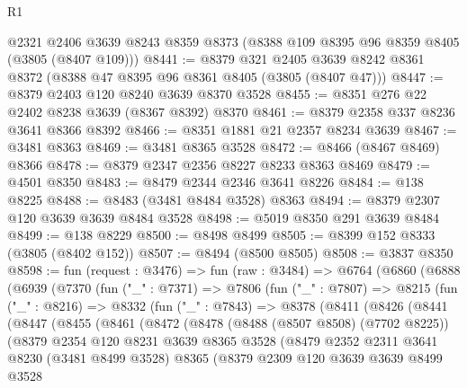 \begin{lexlean}{R1}
\begin{coremodule}
    @2321
    @2406
    @3639
    @8243
    @8359
    @8373
    (@8388 @109 @8395 @96 @8359 @8405 (@3805 (@8407 @109)))
@8441 := @8379
    @321
    @2405
    @3639
    @8242
    @8361
    @8372
    (@8388 @47 @8395 @96 @8361 @8405 (@3805 (@8407 @47)))
@8447 := @8379 @2403 @120 @8240 @3639 @8370 @3528
@8455 := @8351 @276 @22 @2402 @8238 @3639 (@8367 @8392) @8370
@8461 := @8379 @2358 @337 @8236 @3641 @8366 @8392
@8466 := @8351 @1881 @21 @2357 @8234 @3639
@8467 := @3481 @8363
@8469 := @3481 @8365 @3528
@8472 := @8466 (@8467 @8469) @8366
@8478 := @8379 @2347 @2356 @8227 @8233 @8363 @8469
@8479 := @4501 @8350
@8483 := @8479 @2344 @2346 @3641 @8226
@8484 := @138 @8225
@8488 := @8483 (@3481 @8484 @3528) @8363
@8494 := @8379 @2307 @120 @3639 @3639 @8484 @3528
@8498 := @5019 @8350 @291 @3639 @8484
@8499 := @138 @8229
@8500 := @8498 @8499
@8505 := @8399 @152 @8333 (@3805 (@8402 @152))
@8507 := @8494 (@8500 @8505)
@8508 := @3837 @8350
@8598 := fun (request : @3476) =>
  fun (raw : @3484) =>
  @6764
    (@6860
      (@6888
        (@6939
          (@7370
            (fun ("_" : @7371) =>
            @7806
              (fun ("_" : @7807) =>
              @8215
                (fun ("_" : @8216) =>
                @8332
                  (fun ("_" : @7843) =>
                  @8378
                    (@8411
                      (@8426
                        (@8441
                          (@8447
                            (@8455
                              (@8461
                                (@8472
                                  (@8478
                                    (@8488 (@8507 @8508) (@7702 @8225))
                                    (@8379
                                      @2354
                                      @120
                                      @8231
                                      @3639
                                      @8365
                                      @3528
                                      (@8479
                                        @2352
                                        @2311
                                        @3641
                                        @8230
                                        (@3481 @8499 @3528)
                                        @8365
                                        (@8379
                                          @2309
                                          @120
                                          @3639
                                          @3639
                                          @8499
                                          @3528

\end{coremodule}
\end{lexlean}
